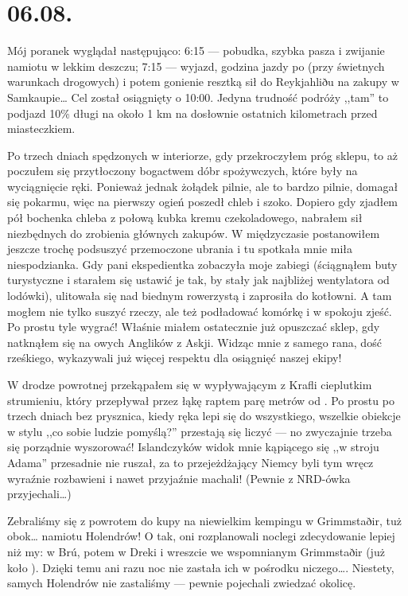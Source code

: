 \chapter*{06.08.}

Mój poranek wyglądał następująco: 6:15 --- pobudka, szybka pasza i zwijanie namiotu w lekkim deszczu; 7:15 --- wyjazd, godzina jazdy po  (przy świetnych warunkach drogowych) i potem gonienie resztką sił do Reykjahliðu na zakupy w Samkaupie… Cel został osiągnięty o 10:00. Jedyna trudność podróży ,,tam'' to podjazd 10\% długi na około 1 km na dosłownie ostatnich kilometrach przed miasteczkiem.

Po trzech dniach spędzonych w interiorze, gdy przekroczyłem próg sklepu, to aż poczułem się przytłoczony bogactwem dóbr spożywczych, które były na wyciągnięcie ręki. Ponieważ jednak żołądek pilnie, ale to bardzo pilnie, domagał się pokarmu, więc na pierwszy ogień poszedł chleb i szoko. Dopiero gdy zjadłem pół bochenka chleba z połową kubka kremu czekoladowego, nabrałem sił niezbędnych do zrobienia głównych zakupów. W międzyczasie postanowiłem jeszcze trochę podsuszyć przemoczone ubrania i tu spotkała mnie miła niespodzianka. Gdy pani ekspedientka zobaczyła moje zabiegi (ściągnąłem buty turystyczne i starałem się ustawić je tak, by stały jak najbliżej wentylatora od lodówki), ulitowała się nad biednym rowerzystą i zaprosiła do kotłowni. A tam mogłem nie tylko suszyć rzeczy, ale też podładować komórkę i w spokoju zjeść. Po prostu tyle wygrać! Właśnie miałem ostatecznie już opuszczać sklep, gdy natknąłem się na owych Anglików z Askji. Widząc mnie z samego rana, dość rześkiego, wykazywali już więcej respektu dla osiągnięć naszej ekipy!

W drodze powrotnej przekąpałem się w wypływającym z Krafli cieplutkim strumieniu, który przepływał przez łąkę raptem parę metrów od . Po prostu po trzech dniach bez prysznica, kiedy ręka lepi się do wszystkiego, wszelkie obiekcje w stylu ,,co sobie ludzie pomyślą?'' przestają się liczyć --- no zwyczajnie trzeba się porządnie wyszorować! Islandczyków widok mnie kąpiącego się ,,w stroju Adama'' przesadnie nie ruszał, za to przejeżdżający Niemcy byli tym wręcz wyraźnie rozbawieni i nawet przyjaźnie machali! (Pewnie z NRD-ówka przyjechali…)

Zebraliśmy się z powrotem do kupy na niewielkim kempingu w Grimmstaðir, tuż obok… namiotu Holendrów! O tak, oni rozplanowali noclegi zdecydowanie lepiej niż my: w Brú, potem w Dreki i wreszcie we wspomnianym Grimmstaðir (już koło ). Dzięki temu ani razu noc nie zastała ich w pośrodku niczego…. Niestety, samych Holendrów nie zastaliśmy --- pewnie pojechali zwiedzać okolicę.

